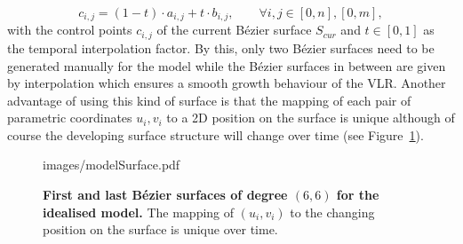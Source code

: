 \documentclass[11pt,a4paper, final]{article}
\begin{document}
\begin{equation}
c_{i,j} = (1-t) \cdot a_{i,j} + t \cdot b_{i,j}, \qquad \forall i, j \in [0, n], [0, m],
\end{equation}
with the control points $c_{i,j}$ of the current B\'ezier surface $S_{cur}$ and $t \in [0,1]$ as the temporal interpolation factor. By this, only two B\'ezier surfaces need to be generated manually for the model while the B\'ezier surfaces in between are given by interpolation which ensures a smooth growth behaviour of the VLR. Another advantage of using this kind of surface is that the mapping of each pair of parametric coordinates $u_i, v_i$ to a 2D position on the surface is unique although of course the developing surface structure will change over time (see Figure~\ref{fig:modelSurface}).
%
\begin{figure}[htbp]
	\begin{center}
		\begin{overpic}[width=0.8\linewidth]{images/modelSurface.pdf}
		\end{overpic}
\caption[]
{
{\bf First and last B\'ezier surfaces of degree $(6, 6)$ for the idealised model.} The mapping of $(u_i, v_i)$ to the changing position on the surface is unique over time.
}
	\label{fig:modelSurface}
	\end{center}
\end{figure}
%
\end{document}

